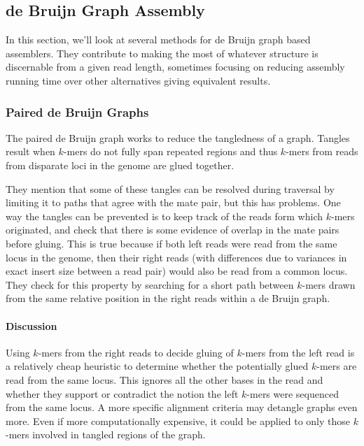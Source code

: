 
\subsection{de Bruijn Graph Assembly} %

In this section, we'll look at several methods for de Bruijn graph based assemblers.  They contribute to making the most of whatever structure is discernable from a given read length, sometimes focusing on reducing assembly running time over other alternatives giving equivalent results.  

\subsubsection{Paired de Bruijn Graphs}

The paired de Bruijn graph \cite{medvedev2011paired} works to reduce the tangledness of a graph.
Tangles result when $k$-mers do not fully span repeated regions and thus $k$-mers from reads from disparate loci in the genome are glued together.

They mention that some of these tangles can be resolved during traversal by limiting it to paths that agree with the mate pair, but this has problems.
One way the tangles can be prevented is to keep track of the reads form which $k$-mers originated, and check that there is some evidence of overlap in the mate pairs before gluing.
This is true because if both left reads were read from the same locus in the genome, then their right reads (with differences due to variances in exact insert size between a read pair) would also be read from a common locus.
They check for this property by searching for a short path between $k$-mers drawn from the same  relative position in the right reads within a de Bruijn graph.  

\paragraph{Discussion}

Using $k$-mers from the right reads to decide gluing of $k$-mers from the left read is a relatively cheap heuristic to determine whether the potentially glued $k$-mers are read from the same locus.  This ignores all the other bases in the read and whether they support or contradict the notion the left $k$-mers were sequenced from the same locus.  A more specific alignment criteria may detangle graphs even more.  Even if more computationally expensive, it could be applied to only those $k$-mers involved in tangled regions of the graph.

